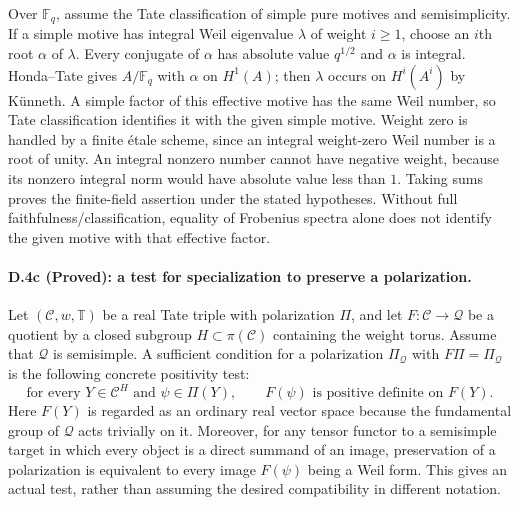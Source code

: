 Over $\mathbb F_q$, assume the Tate classification of simple pure motives
and semisimplicity. If a simple motive has integral Weil eigenvalue
$\lambda$ of weight $i\geq1$, choose an $i$th root $\alpha$ of $\lambda$.
Every conjugate of $\alpha$ has absolute value $q^{1/2}$ and $\alpha$ is
integral. Honda--Tate gives $A/\mathbb F_q$ with $\alpha$ on $H^1(A)$;
then $\lambda$ occurs on $H^i(A^i)$ by K\"unneth. A simple factor of this
effective motive has the same Weil number, so Tate classification
identifies it with the given simple motive. Weight zero is handled by a
finite \'etale scheme, since an integral weight-zero Weil number is a root
of unity. An integral nonzero number cannot have negative weight, because
its nonzero integral norm would have absolute value less than $1$.
Taking sums proves the finite-field assertion under the stated hypotheses.
Without full faithfulness/classification, equality of Frobenius spectra
alone does not identify the given motive with that effective factor.

\paragraph{D.4c (Proved): a test for specialization to preserve a polarization.}
Let $(\mathcal C,w,\mathbb T)$ be a real Tate triple with polarization
$\Pi$, and let $F:\mathcal C\to\mathcal Q$ be a quotient by a closed
subgroup $H\subset\pi(\mathcal C)$ containing the weight torus.
Assume that $\mathcal Q$ is semisimple. A sufficient condition for a
polarization $\Pi_{\mathcal Q}$ with $F\Pi=\Pi_{\mathcal Q}$ is the following
concrete positivity test:
\[
 \text{for every }Y\in\mathcal C^H
 \text{ and }\psi\in\Pi(Y),\qquad
 F(\psi)\text{ is positive definite on }F(Y).
 \tag{D.9}
\]
Here $F(Y)$ is regarded as an ordinary real vector space because the
fundamental group of $\mathcal Q$ acts trivially on it. Moreover, for any
tensor functor to a semisimple target in which every object is a direct
summand of an image, preservation of a polarization is equivalent to
every image $F(\psi)$ being a Weil form. This gives an actual test, rather
than assuming the desired compatibility in different notation.

